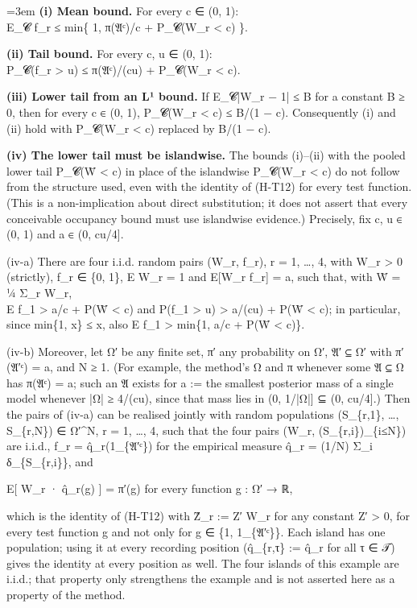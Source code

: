 \documentclass[11pt]{report}
\newenvironment{mdblock}{\begingroup\mdfont\raggedright\setlength{\parindent}{0pt}\setlength{\parskip}{0.55em}\emergencystretch=3em}{\par\endgroup}
\begin{document}
\begin{mdblock}
\textbf{(i) Mean bound.} For every c ∈ (0, 1):\\
\hspace*{1.5em}E\_𝓒 f\_r ≤ min\{ 1, π(𝔄ᶜ)/c + P\_𝓒(W\_r < c) \}.

\textbf{(ii) Tail bound.} For every c, u ∈ (0, 1):\\
\hspace*{1.5em}P\_𝓒(f\_r > u) ≤ π(𝔄ᶜ)/(cu) + P\_𝓒(W\_r < c).

\textbf{(iii) Lower tail from an L¹ bound.} If E\_𝓒|W\_r − 1| ≤ B for a constant B ≥ 0, then for every c ∈ (0, 1), P\_𝓒(W\_r < c) ≤ B/(1 − c). Consequently (i) and (ii) hold with P\_𝓒(W\_r < c) replaced by B/(1 − c).

\textbf{(iv) The lower tail must be islandwise.} The bounds (i)–(ii) with the pooled lower tail P\_𝓒(W̄ < c) in place of the islandwise P\_𝓒(W\_r < c) do not follow from the structure used, even with the identity of (H-T12) for every test function. (This is a non-implication about direct substitution; it does not assert that every conceivable occupancy bound must use islandwise evidence.) Precisely, fix c, u ∈ (0, 1) and a ∈ (0, cu/4].

(iv-a) There are four i.i.d. random pairs (W\_r, f\_r), r = 1, …, 4, with W\_r > 0 (strictly), f\_r ∈ \{0, 1\}, E W\_r = 1 and E[W\_r f\_r] = a, such that, with W̄ = ¼ Σ\_r W\_r,\\
\hspace*{1.5em}E f\_1 > a/c + P(W̄ < c)  and  P(f\_1 > u) > a/(cu) + P(W̄ < c); in particular, since min\{1, x\} ≤ x, also E f\_1 > min\{1, a/c + P(W̄ < c)\}.

(iv-b) Moreover, let Ω′ be any finite set, π′ any probability on Ω′, 𝔄′ ⊆ Ω′ with π′(𝔄′ᶜ) = a, and N ≥ 1. (For example, the method's Ω and π whenever some 𝔄 ⊆ Ω has π(𝔄ᶜ) = a; such an 𝔄 exists for a := the smallest posterior mass of a single model whenever |Ω| ≥ 4/(cu), since that mass lies in (0, 1/|Ω|] ⊆ (0, cu/4].) Then the pairs of (iv-a) can be realised jointly with random populations (S\_\{r,1\}, …, S\_\{r,N\}) ∈ Ω′\textasciicircum{}N, r = 1, …, 4, such that the four pairs (W\_r, (S\_\{r,i\})\_\{i≤N\}) are i.i.d., f\_r = q̂\_r(1\_\{𝔄′ᶜ\}) for the empirical measure q̂\_r = (1/N) Σ\_i δ\_\{S\_\{r,i\}\}, and

\hspace*{1.5em}E[ W\_r · q̂\_r(g) ] = π′(g)  for every function g : Ω′ → ℝ,

which is the identity of (H-T12) with Ẑ\_r := Z′ W\_r for any constant Z′ > 0, for every test function g and not only for g ∈ \{1, 1\_\{𝔄′ᶜ\}\}. Each island has one population; using it at every recording position (q̂\_\{r,τ\} := q̂\_r for all τ ∈ 𝒯) gives the identity at every position as well. The four islands of this example are i.i.d.; that property only strengthens the example and is not asserted here as a property of the method.


\end{mdblock}
\end{document}
